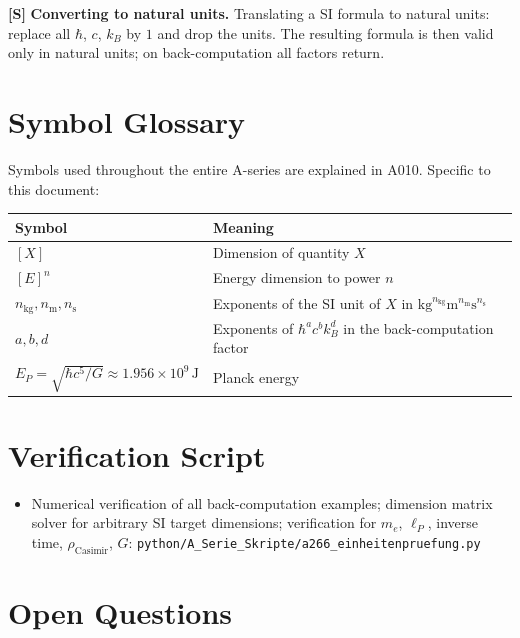 \textbf{[S]} \textbf{Converting to natural units.} Translating a SI formula to
natural units: replace all $\hbar$, $c$, $k_B$ by $1$ and drop the units. The
resulting formula is then valid only in natural units; on back-computation all
factors return.

\section{Symbol Glossary}

Symbols used throughout the entire A-series are explained in A010.
Specific to this document:

\begin{center}
\renewcommand{\arraystretch}{1.3}
{\small\begin{tabular}{lp{9cm}}
\toprule
Symbol & Meaning \\
\midrule
$[X]$ & Dimension of quantity $X$ \\
$[E]^n$ & Energy dimension to power $n$ \\
$n_\text{kg},n_\text{m},n_\text{s}$ & Exponents of the SI unit of $X$
  in $\text{kg}^{n_\text{kg}}\text{m}^{n_\text{m}}\text{s}^{n_\text{s}}$ \\
$a,b,d$ & Exponents of $\hbar^a c^b k_B^d$ in the back-computation factor \\
$E_P = \sqrt{\hbar c^5/G}\approx1{.}956\times10^9\,\text{J}$ & Planck energy \\
\bottomrule
\end{tabular}}
\renewcommand{\arraystretch}{1.0}
\end{center}

\section{Verification Script}

\begin{itemize}[leftmargin=2em,itemsep=2pt,topsep=2pt]
  \item Numerical verification of all back-computation examples; dimension matrix
    solver for arbitrary SI target dimensions; verification for $m_e$, $\ell_P$,
    inverse time, $\rho_\text{Casimir}$, $G$:
    \texttt{python/A\_Serie\_Skripte/a266\_einheitenpruefung.py}
\end{itemize}

\section{Open Questions}

